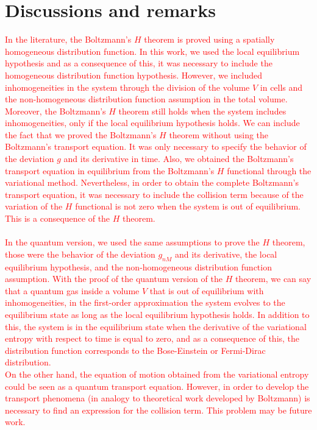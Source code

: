 \documentclass{article}
\begin{document}
\section{Discussions and remarks}
\textcolor{red}{
In the literature, the Boltzmann's $H$ theorem is proved using a spatially homogeneous distribution function. In this work, we used the local equilibrium hypothesis and as a consequence of this, it was necessary to include the homogeneous distribution function hypothesis. However, we included inhomogeneities in the system through the division of the volume $V$ in cells and the non-homogeneous distribution function assumption in the total volume. Moreover, the Boltzmann's $H$ theorem still holds when the system includes inhomogeneities, only if the local equilibrium hypothesis holds. We can include the fact that we proved the Boltzmann's $H$ theorem without using the Boltzmann's transport equation. It was only necessary to specify the behavior of the deviation $g$ and its derivative in time. Also, we obtained the Boltzmann's transport equation in equilibrium from the Boltzmann's $H$ functional through the variational method. Nevertheless, in order to obtain the complete Boltzmann's transport equation, it was necessary to include the collision term because of the variation of the $H$ functional is not zero when the system is out of equilibrium. This is a consequence of the $H$ theorem.\\
\\
In the quantum version, we used the same assumptions to prove the $H$ theorem, those were the behavior of the deviation $g_{nM}$ and its derivative, the local equilibrium hypothesis, and the non-homogeneous distribution function assumption. With the proof of the quantum version of the $H$ theorem, we can say that a quantum gas inside a volume $V$ that is out of equilibrium with inhomogeneities, in the first-order approximation the system evolves to the equilibrium state as long as the local equilibrium hypothesis holds. In addition to this, the system is in the equilibrium state when the derivative of the variational entropy with respect to time is equal to zero, and as a consequence of this, the distribution function corresponds to the Bose-Einstein or Fermi-Dirac distribution.\\
On the other hand, the equation of motion obtained from the variational entropy could be seen as a quantum transport equation. However, in order to develop the transport phenomena (in analogy to theoretical work developed by Boltzmann) is necessary to find an expression for the collision term. This problem may be future work.\\
}
\end{document}
